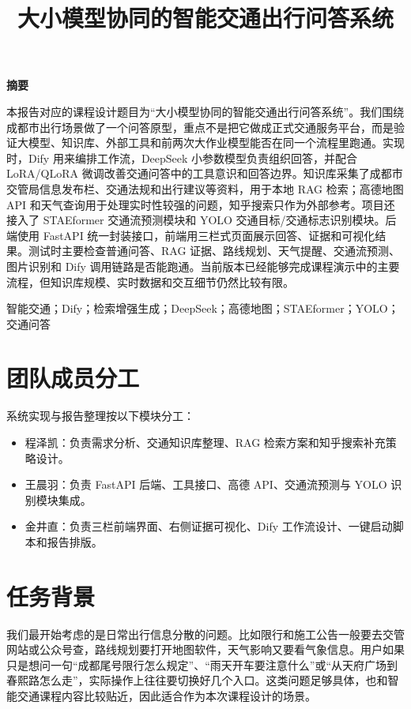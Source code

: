 \documentclass[bwprint]{report}
\title{大小模型协同的智能交通出行问答系统}
\begin{document}
\maketitle
\newpage

\pagestyle{plain}
\begin{center}
    {\bfseries 摘要}
\end{center}

本报告对应的课程设计题目为``大小模型协同的智能交通出行问答系统''。我们围绕成都市出行场景做了一个问答原型，重点不是把它做成正式交通服务平台，而是验证大模型、知识库、外部工具和前两次大作业模型能否在同一个流程里跑通。实现时，Dify 用来编排工作流，DeepSeek 小参数模型负责组织回答，并配合 LoRA/QLoRA 微调改善交通问答中的工具意识和回答边界。知识库采集了成都市交管局信息发布栏、交通法规和出行建议等资料，用于本地 RAG 检索；高德地图 API 和天气查询用于处理实时性较强的问题，知乎搜索只作为外部参考。项目还接入了 STAEformer 交通流预测模块和 YOLO 交通目标/交通标志识别模块。后端使用 FastAPI 统一封装接口，前端用三栏式页面展示回答、证据和可视化结果。测试时主要检查普通问答、RAG 证据、路线规划、天气提醒、交通流预测、图片识别和 Dify 调用链路是否能跑通。当前版本已经能够完成课程演示中的主要流程，但知识库规模、实时数据和交互细节仍然比较有限。

\vspace{0.5em}
智能交通；Dify；检索增强生成；DeepSeek；高德地图；STAEformer；YOLO；交通问答

\newpage
\tableofcontents
\newpage
\pagestyle{plain}
\setcounter{page}{1}

\section{团队成员分工}
系统实现与报告整理按以下模块分工：
\begin{itemize}
    \item 程泽凯：负责需求分析、交通知识库整理、RAG 检索方案和知乎搜索补充策略设计。
    \item 王晨羽：负责 FastAPI 后端、工具接口、高德 API、交通流预测与 YOLO 识别模块集成。
    \item 金井直：负责三栏前端界面、右侧证据可视化、Dify 工作流设计、一键启动脚本和报告排版。
\end{itemize}

\section{任务背景}
我们最开始考虑的是日常出行信息分散的问题。比如限行和施工公告一般要去交管网站或公众号查，路线规划要打开地图软件，天气影响又要看气象信息。用户如果只是想问一句``成都尾号限行怎么规定''、``雨天开车要注意什么''或``从天府广场到春熙路怎么走''，实际操作上往往要切换好几个入口。这类问题足够具体，也和智能交通课程内容比较贴近，因此适合作为本次课程设计的场景。
\end{document}
